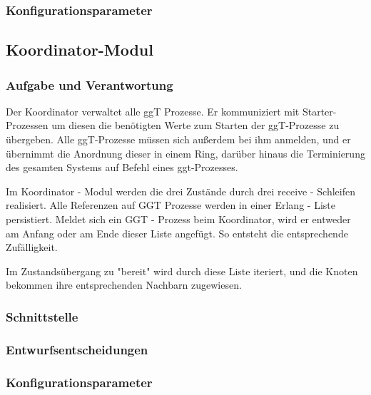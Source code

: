 \documentclass{article}
\begin{document}
\subsubsection{Konfigurationsparameter}

\newpage

\subsection{Koordinator-Modul}
\subsubsection{Aufgabe und Verantwortung}

Der Koordinator verwaltet alle ggT Prozesse. Er kommuniziert mit Starter-Prozessen um diesen die benötigten
Werte zum Starten der ggT-Prozesse zu übergeben. Alle ggT-Prozesse müssen sich außerdem bei ihm anmelden,
und er übernimmt die Anordnung dieser in einem Ring, darüber hinaus die Terminierung des gesamten Systems auf Befehl eines
ggt-Prozesses.

Im Koordinator - Modul werden die drei Zustände durch drei receive - Schleifen realisiert. Alle Referenzen auf GGT
Prozesse werden in einer Erlang - Liste persistiert. Meldet sich ein GGT - Prozess beim Koordinator,
wird er entweder am Anfang oder am Ende dieser Liste angefügt. So entsteht die entsprechende Zufälligkeit.

Im Zustandsübergang zu "bereit" wird durch diese Liste iteriert, und die Knoten bekommen ihre entsprechenden Nachbarn
zugewiesen.


\subsubsection{Schnittstelle}

\subsubsection{Entwurfsentscheidungen}

\subsubsection{Konfigurationsparameter}
\end{document}
